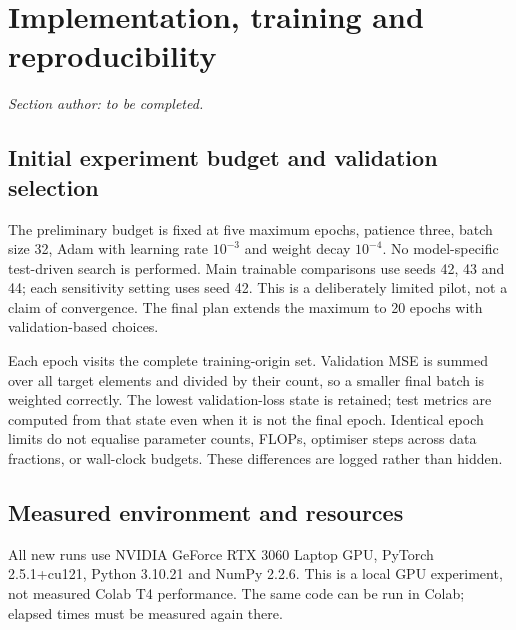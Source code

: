 \documentclass[10pt,a4paper]{article}
\begin{document}
\clearpage
\section{Implementation, training and reproducibility}
\noindent\textit{Section author: to be completed.}


\subsection{Initial experiment budget and validation selection}
The preliminary budget is fixed at five maximum epochs, patience three, batch size 32, Adam with learning rate $10^{-3}$ and weight decay $10^{-4}$. No model-specific test-driven search is performed. Main trainable comparisons use seeds 42, 43 and 44; each sensitivity setting uses seed 42. This is a deliberately limited pilot, not a claim of convergence. The final plan extends the maximum to 20 epochs with validation-based choices.

Each epoch visits the complete training-origin set. Validation MSE is summed over all target elements and divided by their count, so a smaller final batch is weighted correctly. The lowest validation-loss state is retained; test metrics are computed from that state even when it is not the final epoch. Identical epoch limits do not equalise parameter counts, FLOPs, optimiser steps across data fractions, or wall-clock budgets. These differences are logged rather than hidden.
\subsection{Measured environment and resources}
All new runs use NVIDIA GeForce RTX 3060 Laptop GPU, PyTorch 2.5.1+cu121, Python 3.10.21 and NumPy 2.2.6. 
This is a local GPU experiment, not measured Colab T4 performance. The same code can be run in Colab; elapsed times must be measured again there.
\end{document}
